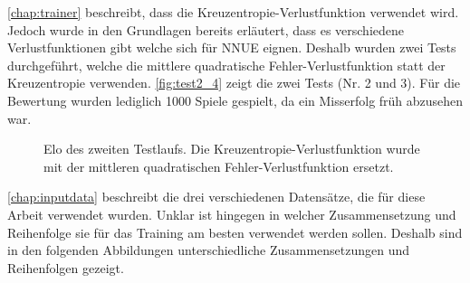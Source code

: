 
\autoref{chap:trainer} beschreibt, dass die Kreuzentropie-Verlustfunktion verwendet wird. Jedoch wurde in den Grundlagen bereits erläutert, dass es verschiedene Verlustfunktionen gibt welche sich für \ac{NNUE} eignen. Deshalb wurden zwei Tests durchgeführt, welche die mittlere quadratische Fehler-Verlustfunktion statt der Kreuzentropie verwenden. \autoref{fig:test2_4} zeigt die zwei Tests (Nr. 2 und 3). Für die Bewertung wurden lediglich 1000 Spiele gespielt, da ein Misserfolg früh abzusehen war.

\begin{figure}
  \centering
  \caption{Elo des zweiten Testlaufs. Die Kreuzentropie-Verlustfunktion wurde mit der mittleren quadratischen Fehler-Verlustfunktion ersetzt.}
  \label{fig:test2_4}
\end{figure}

\autoref{chap:inputdata} beschreibt die drei verschiedenen Datensätze, die für diese Arbeit verwendet wurden. Unklar ist hingegen in welcher Zusammensetzung und Reihenfolge sie für das Training am besten verwendet werden sollen. Deshalb sind in den folgenden Abbildungen unterschiedliche Zusammensetzungen und Reihenfolgen gezeigt.

